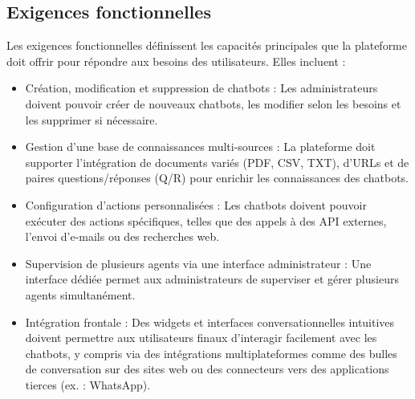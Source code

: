 \subsection{Exigences fonctionnelles}
Les exigences fonctionnelles définissent les capacités principales que la plateforme doit offrir pour répondre aux besoins des utilisateurs. Elles incluent :
\begin{itemize}[label=\textbullet]
\item Création, modification et suppression de chatbots : Les administrateurs doivent pouvoir créer de nouveaux chatbots, les modifier selon les besoins et les supprimer si nécessaire.
\item Gestion d’une base de connaissances multi-sources : La plateforme doit supporter l’intégration de documents variés (PDF, CSV, TXT), d’URLs et de paires questions/réponses (Q/R) pour enrichir les connaissances des chatbots.
\item Configuration d’actions personnalisées : Les chatbots doivent pouvoir exécuter des actions spécifiques, telles que des appels à des API externes, l’envoi d’e-mails ou des recherches web.
\item Supervision de plusieurs agents via une interface administrateur : Une interface dédiée permet aux administrateurs de superviser et gérer plusieurs agents simultanément.
\item Intégration frontale : Des widgets et interfaces conversationnelles intuitives doivent permettre aux utilisateurs finaux d’interagir facilement avec les chatbots, y compris via des intégrations multiplateformes comme des bulles de conversation sur des sites web ou des connecteurs vers des applications tierces (ex. : WhatsApp).
\end{itemize}
